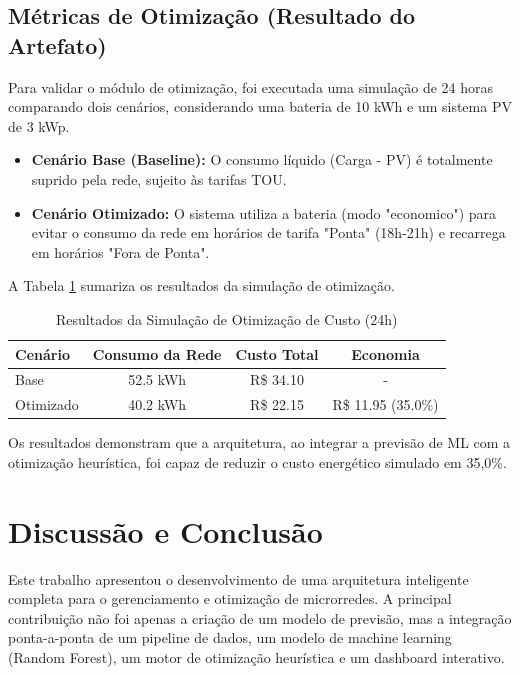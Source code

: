 \documentclass[conference]{IEEEtran}
\begin{document}
\subsection{Métricas de Otimização (Resultado do Artefato)}
Para validar o módulo de otimização, foi executada uma simulação de 24 horas comparando dois cenários, considerando uma bateria de 10 kWh e um sistema PV de 3 kWp.
\begin{itemize}
    \item \textbf{Cenário Base (Baseline):} O consumo líquido (Carga - PV) é totalmente suprido pela rede, sujeito às tarifas TOU.
    \item \textbf{Cenário Otimizado:} O sistema utiliza a bateria (modo "economico") para evitar o consumo da rede em horários de tarifa "Ponta" (18h-21h) e recarrega em horários "Fora de Ponta".
\end{itemize}

A Tabela \ref{tab:otimizacao} sumariza os resultados da simulação de otimização.

\begin{table}[htbp]
\caption{Resultados da Simulação de Otimização de Custo (24h)}
\label{tab:otimizacao}
\centering
\renewcommand{\arraystretch}{1.3}
\begin{tabular}{lccc}
\toprule
\textbf{Cenário} & \textbf{Consumo da Rede} & \textbf{Custo Total} & \textbf{Economia} \\
\midrule
Base & 52.5 kWh & R\$ 34.10 & - \\
Otimizado & 40.2 kWh & R\$ 22.15 & R\$ 11.95 (35.0\%) \\
\bottomrule
\end{tabular}
\end{table}

Os resultados demonstram que a arquitetura, ao integrar a previsão de ML com a otimização heurística, foi capaz de reduzir o custo energético simulado em 35,0\%.

\section{Discussão e Conclusão}

Este trabalho apresentou o desenvolvimento de uma arquitetura inteligente completa para o gerenciamento e otimização de microrredes. A principal contribuição não foi apenas a criação de um modelo de previsão, mas a integração ponta-a-ponta de um pipeline de dados, um modelo de machine learning (Random Forest), um motor de otimização heurística e um dashboard interativo.
\end{document}
